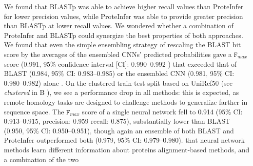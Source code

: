 We found that BLASTp was able to achieve higher recall values than ProteInfer for lower precision values, while ProteInfer was able to provide greater precision than BLASTp at lower recall values. \DIFaddbegin {}\DIFaddend We wondered whether a combination of ProteInfer and BLASTp could synergize the best properties of both approaches. We found that even the simple ensembling strategy of rescaling the BLAST bit score by the averages of the ensembled CNNs' predicted probabilities gave a $\texttt{F}_{max}$ score (0.991, 95\% confidence interval [CI]: 0.990--0.992 ) that exceeded that of BLAST (0.984, 95\% CI: 0.983--0.985) or the ensembled CNN (0.981, 95\% CI: 0.980--0.982) alone \DIFaddbegin {}\DIFaddend . 
On the clustered train-test split based on UniRef50 (see \textit{clustered} in B%
), we see a performance drop in all methods: this is expected, as remote homology tasks are designed to challenge methods to generalize farther in sequence space. The $\texttt{F}_{max}$ score of a single neural network fell to 0.914 (95\% CI: 0.913--0.915, precision: 0.959 recall: 0.875), substantially lower than BLAST (0.950, 95\% CI: 0.950--0.951), though again an ensemble of both BLAST and ProteInfer outperformed both (0.979, 95\% CI: 0.979--0.980). \DIFdelbegin {}\DIFdelend \DIFaddbegin {}\DIFaddend that neural network methods learn different information about proteins \DIFdelbegin {}\DIFdelend \DIFaddbegin {}\DIFaddend alignment-based methods, and \DIFaddbegin {}\DIFaddend a combination of the two \DIFdelbegin {}\DIFdelend \DIFaddbegin {}%
\DIFaddend 


